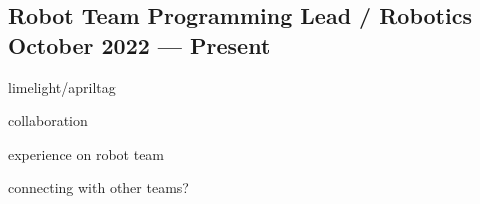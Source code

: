 \subsection{{Robot Team Programming Lead / Robotics \hfill October 2022 --- Present}}
\begin{zitemize}
\item limelight/apriltag
\item collaboration
\item experience on robot team
\item connecting with other teams?
\end{zitemize}

